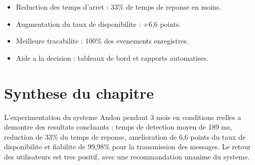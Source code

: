 \begin{itemize}
    \item Reduction des temps d'arret : 33\% de temps de reponse en moins.
    \item Augmentation du taux de disponibilite : +6,6 points.
    \item Meilleure tracabilite : 100\% des evenements enregistres.
    \item Aide a la decision : tableaux de bord et rapports automatises.
\end{itemize}

\section{Synthese du chapitre}

L'experimentation du systeme Andon pendant 3 mois en conditions reelles a demontre des resultats concluants : temps de detection moyen de 189 ms, reduction de 33\% du temps de reponse, amelioration de 6,6 points du taux de disponibilite et fiabilite de 99,98\% pour la transmission des messages. Le retour des utilisateurs est tres positif, avec une recommandation unanime du systeme.
